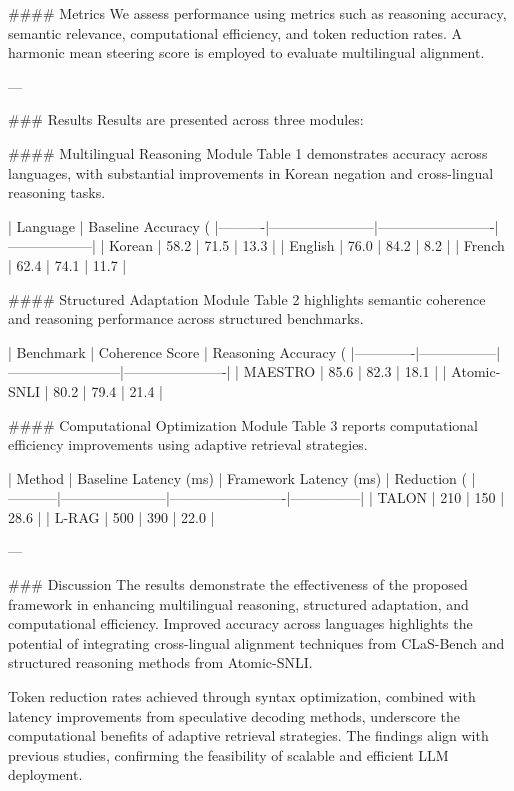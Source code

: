 #### Metrics  
We assess performance using metrics such as reasoning accuracy, semantic relevance, computational efficiency, and token reduction rates. A harmonic mean steering score is employed to evaluate multilingual alignment.

---

### Results  
Results are presented across three modules:

#### Multilingual Reasoning Module  
Table 1 demonstrates accuracy across languages, with substantial improvements in Korean negation and cross-lingual reasoning tasks.  

| Language | Baseline Accuracy (%
|----------|-----------------------|-------------------------|------------------|
| Korean   | 58.2                 | 71.5                   | 13.3            |
| English  | 76.0                 | 84.2                   | 8.2             |
| French   | 62.4                 | 74.1                   | 11.7            |

#### Structured Adaptation Module  
Table 2 highlights semantic coherence and reasoning performance across structured benchmarks.  

| Benchmark   | Coherence Score | Reasoning Accuracy (%
|-------------|-----------------|------------------------|----------------------|
| MAESTRO     | 85.6            | 82.3                  | 18.1                |
| Atomic-SNLI | 80.2            | 79.4                  | 21.4                |

#### Computational Optimization Module  
Table 3 reports computational efficiency improvements using adaptive retrieval strategies.  

| Method    | Baseline Latency (ms) | Framework Latency (ms) | Reduction (%
|-----------|-----------------------|-------------------------|---------------|
| TALON     | 210                  | 150                    | 28.6          |
| L-RAG     | 500                  | 390                    | 22.0          |

---

### Discussion  
The results demonstrate the effectiveness of the proposed framework in enhancing multilingual reasoning, structured adaptation, and computational efficiency. Improved accuracy across languages highlights the potential of integrating cross-lingual alignment techniques from CLaS-Bench and structured reasoning methods from Atomic-SNLI.

Token reduction rates achieved through syntax optimization, combined with latency improvements from speculative decoding methods, underscore the computational benefits of adaptive retrieval strategies. The findings align with previous studies, confirming the feasibility of scalable and efficient LLM deployment.

